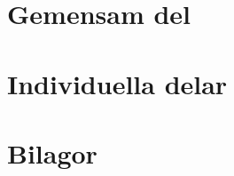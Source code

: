 \documentclass[bachelor,lith,swedish]{liuthesis}
\author{\parbox{\textwidth}{
    Joakim Argillander\\
    Victor Bodin \\
    Sebastian Callh\\
    Rebecca Lindblom \\
    Johan Nåtoft \\
    Johan Thornström \\
    Jonathan Wahlund\\
    Daniel Wassing}
}
\begin{document}
\renewcommand{\partname}{Del}
\pagestyle{plain}
\part{Gemensam del}







\part{Individuella delar}
\renewcommand{\thechapter}{\Alph{chapter}}








\renewcommand*\thesection{\arabic{section}}
\part{Bilagor}
\renewcommand{\thechapter}{Bilaga \arabic{chapter}}





\clearpage
\printbibliography
\end{document}
